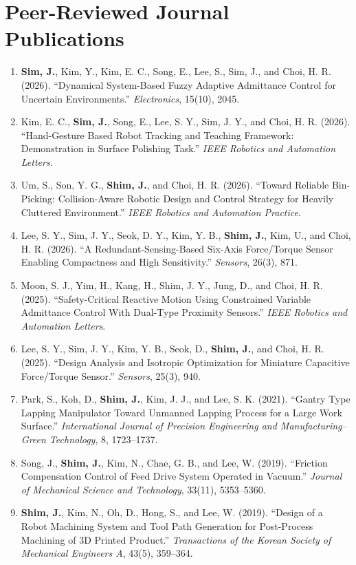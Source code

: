 \documentclass[10pt,letterpaper]{article}
\newcommand{\pub}[1]{\item #1}
\begin{document}
\section{Peer-Reviewed Journal Publications}
\begin{enumerate}[leftmargin=1.55em,itemsep=3pt,topsep=2pt]
  \pub{\textbf{Sim, J.}, Kim, Y., Kim, E. C., Song, E., Lee, S., Sim, J., and Choi, H. R. (2026). ``Dynamical System-Based Fuzzy Adaptive Admittance Control for Uncertain Environments.'' \textit{Electronics}, 15(10), 2045.}
  \pub{Kim, E. C., \textbf{Sim, J.}, Song, E., Lee, S. Y., Sim, J. Y., and Choi, H. R. (2026). ``Hand-Gesture Based Robot Tracking and Teaching Framework: Demonstration in Surface Polishing Task.'' \textit{IEEE Robotics and Automation Letters}.}
  \pub{Um, S., Son, Y. G., \textbf{Shim, J.}, and Choi, H. R. (2026). ``Toward Reliable Bin-Picking: Collision-Aware Robotic Design and Control Strategy for Heavily Cluttered Environment.'' \textit{IEEE Robotics and Automation Practice}.}
  \pub{Lee, S. Y., Sim, J. Y., Seok, D. Y., Kim, Y. B., \textbf{Shim, J.}, Kim, U., and Choi, H. R. (2026). ``A Redundant-Sensing-Based Six-Axis Force/Torque Sensor Enabling Compactness and High Sensitivity.'' \textit{Sensors}, 26(3), 871.}
  \pub{Moon, S. J., Yim, H., Kang, H., Shim, J. Y., Jung, D., and Choi, H. R. (2025). ``Safety-Critical Reactive Motion Using Constrained Variable Admittance Control With Dual-Type Proximity Sensors.'' \textit{IEEE Robotics and Automation Letters}.}
  \pub{Lee, S. Y., Sim, J. Y., Kim, Y. B., Seok, D., \textbf{Shim, J.}, and Choi, H. R. (2025). ``Design Analysis and Isotropic Optimization for Miniature Capacitive Force/Torque Sensor.'' \textit{Sensors}, 25(3), 940.}
  \pub{Park, S., Koh, D., \textbf{Shim, J.}, Kim, J. J., and Lee, S. K. (2021). ``Gantry Type Lapping Manipulator Toward Unmanned Lapping Process for a Large Work Surface.'' \textit{International Journal of Precision Engineering and Manufacturing--Green Technology}, 8, 1723--1737.}
  \pub{Song, J., \textbf{Shim, J.}, Kim, N., Chae, G. B., and Lee, W. (2019). ``Friction Compensation Control of Feed Drive System Operated in Vacuum.'' \textit{Journal of Mechanical Science and Technology}, 33(11), 5353--5360.}
  \pub{\textbf{Shim, J.}, Kim, N., Oh, D., Hong, S., and Lee, W. (2019). ``Design of a Robot Machining System and Tool Path Generation for Post-Process Machining of 3D Printed Product.'' \textit{Transactions of the Korean Society of Mechanical Engineers A}, 43(5), 359--364.}
\end{enumerate}
\end{document}
